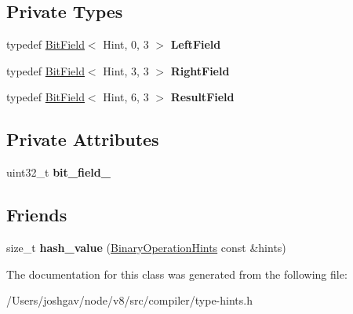 \subsection*{Private Types}
\begin{DoxyCompactItemize}
\item 
typedef \hyperlink{classv8_1_1internal_1_1_bit_field}{Bit\+Field}$<$ Hint, 0, 3 $>$ {\bfseries Left\+Field}\hypertarget{classv8_1_1internal_1_1compiler_1_1_binary_operation_hints_a70bbd62e7d30ae30b70d44b73068ef98}{}\label{classv8_1_1internal_1_1compiler_1_1_binary_operation_hints_a70bbd62e7d30ae30b70d44b73068ef98}

\item 
typedef \hyperlink{classv8_1_1internal_1_1_bit_field}{Bit\+Field}$<$ Hint, 3, 3 $>$ {\bfseries Right\+Field}\hypertarget{classv8_1_1internal_1_1compiler_1_1_binary_operation_hints_a4f3669d27562da8876aadf52058f53f2}{}\label{classv8_1_1internal_1_1compiler_1_1_binary_operation_hints_a4f3669d27562da8876aadf52058f53f2}

\item 
typedef \hyperlink{classv8_1_1internal_1_1_bit_field}{Bit\+Field}$<$ Hint, 6, 3 $>$ {\bfseries Result\+Field}\hypertarget{classv8_1_1internal_1_1compiler_1_1_binary_operation_hints_a196af45c2d24a75f3c62807650ad7d78}{}\label{classv8_1_1internal_1_1compiler_1_1_binary_operation_hints_a196af45c2d24a75f3c62807650ad7d78}

\end{DoxyCompactItemize}
\subsection*{Private Attributes}
\begin{DoxyCompactItemize}
\item 
uint32\+\_\+t {\bfseries bit\+\_\+field\+\_\+}\hypertarget{classv8_1_1internal_1_1compiler_1_1_binary_operation_hints_ae4e7380d5eda7d2ca65bae794f012fe8}{}\label{classv8_1_1internal_1_1compiler_1_1_binary_operation_hints_ae4e7380d5eda7d2ca65bae794f012fe8}

\end{DoxyCompactItemize}
\subsection*{Friends}
\begin{DoxyCompactItemize}
\item 
size\+\_\+t {\bfseries hash\+\_\+value} (\hyperlink{classv8_1_1internal_1_1compiler_1_1_binary_operation_hints}{Binary\+Operation\+Hints} const \&hints)\hypertarget{classv8_1_1internal_1_1compiler_1_1_binary_operation_hints_aa949f634fa8abe9caf86dd175a22f563}{}\label{classv8_1_1internal_1_1compiler_1_1_binary_operation_hints_aa949f634fa8abe9caf86dd175a22f563}

\end{DoxyCompactItemize}


The documentation for this class was generated from the following file\+:\begin{DoxyCompactItemize}
\item 
/\+Users/joshgav/node/v8/src/compiler/type-\/hints.\+h\end{DoxyCompactItemize}

